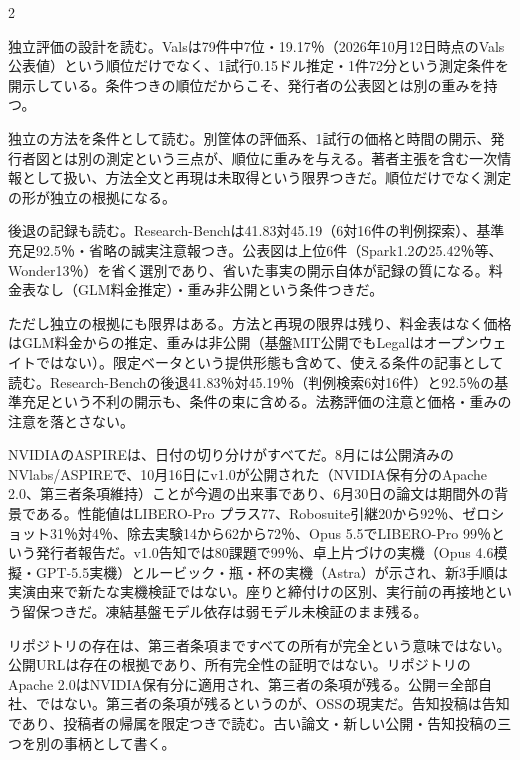 \documentclass[lualatex,a4paper,10pt]{jlreq}
\begin{document}
\begin{multicols}{2} %


独立評価の設計を読む。Valsは79件中7位・19.17％（2026年10月12日時点のVals公表値）という順位だけでなく、1試行0.15ドル推定・1件72分という測定条件を開示している。条件つきの順位だからこそ、発行者の公表図とは別の重みを持つ。
\cite{B55,B53,B54}


独立の方法を条件として読む。別筐体の評価系、1試行の価格と時間の開示、発行者図とは別の測定という三点が、順位に重みを与える。著者主張を含む一次情報として扱い、方法全文と再現は未取得という限界つきだ。順位だけでなく測定の形が独立の根拠になる。
\cite{B55,B53,B54}


後退の記録も読む。Research-Benchは41.83対45.19（6対16件の判例探索）、基準充足92.5％・省略の誠実注意報つき。公表図は上位6件（Spark1.2の25.42％等、Wonder13％）を省く選別であり、省いた事実の開示自体が記録の質になる。料金表なし（GLM料金推定）・重み非公開という条件つきだ。
\cite{B55,B53,B54}


ただし独立の根拠にも限界はある。方法と再現の限界は残り、料金表はなく価格はGLM料金からの推定、重みは非公開（基盤MIT公開でもLegalはオープンウェイトではない）。限定ベータという提供形態も含めて、使える条件の記事として読む。Research-Benchの後退41.83％対45.19％（判例検索6対16件）と92.5％の基準充足という不利の開示も、条件の束に含める。法務評価の注意と価格・重みの注意を落とさない。
\cite{B55,B53,B54}


NVIDIAのASPIREは、日付の切り分けがすべてだ。8月には公開済みのNVlabs/ASPIREで、10月16日にv1.0が公開された（NVIDIA保有分のApache 2.0、第三者条項維持）ことが今週の出来事であり、6月30日の論文は期間外の背景である。性能値はLIBERO-Pro プラス77、Robosuite引継20から92％、ゼロショット31％対4％、除去実験14から62から72％、Opus 5.5でLIBERO-Pro 99％という発行者報告だ。v1.0告知では80課題で99％、卓上片づけの実機（Opus 4.6模擬・GPT-5.5実機）とルービック・瓶・杯の実機（Astra）が示され、新3手順は実演由来で新たな実機検証ではない。座りと締付けの区別、実行前の再接地という留保つきだ。凍結基盤モデル依存は弱モデル未検証のまま残る。
\cite{B57,B56,B89}


リポジトリの存在は、第三者条項まですべての所有が完全という意味ではない。公開URLは存在の根拠であり、所有完全性の証明ではない。リポジトリのApache 2.0はNVIDIA保有分に適用され、第三者の条項が残る。公開＝全部自社、ではない。第三者の条項が残るというのが、OSSの現実だ。告知投稿は告知であり、投稿者の帰属を限定つきで読む。古い論文・新しい公開・告知投稿の三つを別の事柄として書く。
\cite{B57,B56}



\end{multicols}
\end{document}
